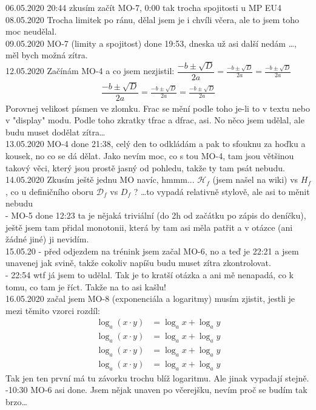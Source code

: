 \documentclass[12pt]{article}
\begin{document}
06.05.2020 20:44 zkusím začít MO-7, 0:00 tak trocha spojitosti u MP EU4\\
08.05.2020 Trocha limitek po ránu, dělal jsem je i chvíli včera, ale to jsem toho moc neudělal.\\
09.05.2020 MO-7 (limity a spojitost) done 19:53, dneska už asi další nedám \dots , měl bych možná zítra.\\
12.05.2020 Začínám MO-4 a co jsem nezjistil: $\dfrac{-b \pm \sqrt{D}}{2a} = \frac{-b \pm \sqrt{D}}{2a} = \tfrac{-b \pm \sqrt{D}}{2a} $
\begin{align*}
\dfrac{-b \pm \sqrt{D}}{2a} = \frac{-b \pm \sqrt{D}}{2a} = \tfrac{-b \pm \sqrt{D}}{2a}
\end{align*}
Porovnej velikost písmen ve zlomku. Frac se mění podle toho je-li to v textu nebo v "display" modu. Podle toho zkratky tfrac a dfrac, asi. No něco jsem udělal, ale budu muset dodělat zítra\dots \\
13.05.2020 MO-4 done 21:38, celý den to odkládám a pak to sfouknu za hoďku a kousek, no co se dá dělat. Jako nevím moc, co s tou MO-4, tam jsou většinou takový věci, který jsou prostě jasný od pohledu, takže ty tam psát nebudu.\\
14.05.2020 Zkusím ještě jednu MO navíc, hmmm... $ \mathcal {H}_{f}$ (jsem našel na wiki) vs $H_f$, co u definičního oboru $\mathcal{D}_f$ vs $D_f$ ? \dots to vypadá relativně stylově, ale asi to měnit nebudu\\
 - MO-5 done 12:23 ta je nějaká triviální (do 2h od začátku po zápis do deníčku), ještě jsem tam přidal monotonii, která by tam asi měla patřit a v otázce (ani žádné jiné) ji nevidím.\\
15.05.20 - před odjezdem na trénink jsem začal MO-6, no a teď je 22:21 a jsem unavenej jak svině, takže cokoliv napíšu budu muset zítra zkontrolovat.\\
 - 22:54 wtf já jsem to udělal. Tak je to kratší otázka a ani mě nenapadá, co k tomu, co tam je říct. Takže na to asi kašlu!\\
16.05.2020 začal jsem MO-8 (exponenciála a logaritmy) musím zjistit, jestli je mezi těmito vzorci rozdíl:
\begin{align*}
\log_a (x \cdot y) &= \log_a x + \log_a y\\
\log_a{(x \cdot y)} &= \log_a{x} + \log_a{y}\\
\log_a{\left(x \cdot y \right)} &= \log_a{x} + \log_a{y}\\
\log_a \left(x \cdot y \right) &= \log_a x + \log_a y
\end{align*}
Tak jen ten první má tu závorku trochu blíž logaritmu. Ale jinak vypadají stejně.\\
 -10:30 MO-6 asi done. Jsem nějak unaven po včerejšku, nevím proč se budím tak brzo\dots
\end{document}
